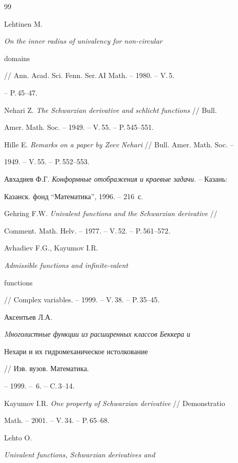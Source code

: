 \begin{thebibliography}{99}







Lehtinen M. {\em On the inner radius of univalency for non-circular 


domains} // Ann. Acad. Sci. Fenn. Ser.\,AI Math. -- 1980. -- V.\,5.


-- P.\,45--47.




Nehari Z. {\em The Schwarzian derivative and schlicht functions} // Bull. 


Amer. Math. Soc. -- 1949. -- V.\,55. -- P.\,545--551.




Hille E. {\em Remarks on a paper by Zeev Nehari} // Bull. Amer. Math. Soc. -- 


1949. -- V.\,55. -- P.\,552--553.




Авхадиев Ф.Г. {\em Конформные отображения и краевые задачи}. -- Казань: 


Казанск. фонд ``Математика'', 1996. -- 216~с.




Gehring F.W. {\em Univalent functions and the Schwarzian derivative} // 


Comment. Math. Helv. -- 1977.  -- V.\,52.  -- P.\,561--572.




Avhadiev F.G., Kayumov I.R. {\em Admissible functions and infinite-valent 


functions} // Complex variables. -- 1999. -- V.\,38. -- P.\,35--45.




Аксентьев Л.А. {\em Mноголистные функции из расширенных классов Беккера и 


Нехари и их гидромеханическое истолкование} // Изв. вузов. Математика.


-- 1999. -- \No\,6. -- C.\,3--14.




Kayumov I.R. {\em One property of Schwarzian derivative} // Demonstratio 


Math. -- 2001. -- V.\,34. -- P.\,65--68.




Lehto O. {\em Univalent functions, Schwarzian derivatives and 


}
\end{thebibliography}
